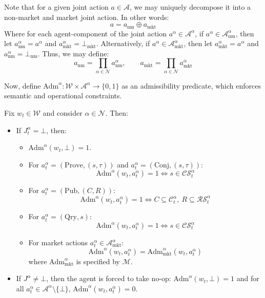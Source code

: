 \documentclass[letterpaper]{article} %
\begin{document}
Note that for a  given joint action $a \in \mathcal{A}$, we may uniquely decompose it into a non-market and market joint action. In other words:
\[a = a_{\mathrm{nm}} \oplus a_{\mathrm{mkt}}\]
Where for each agent-component of the joint action $a^\alpha \in \mathcal{A}^\alpha$, if $a^\alpha \in \mathcal{A}^\alpha_{\mathrm{nm}}$, then let $a^\alpha_{\mathrm{nm}} = a^\alpha$ and $a^\alpha_{\mathrm{mkt}} = \bot_{\mathrm{mkt}}$. Alternatively, if $a^\alpha \in \mathcal{A}^\alpha_{\mathrm{mkt}}$, then let $a^\alpha_{\mathrm{mkt}} = a^\alpha$ and $a^\alpha_{\mathrm{nm}} = \bot_{\mathrm{nm}}$. Thus, we may define:
\[a_{\mathrm{nm}} = \prod_{\alpha \in \mathcal{N}} a^\alpha_{\mathrm{nm}},\qquad a_{\mathrm{mkt}} = \prod_{\alpha \in \mathcal{N}} a^\alpha_{\mathrm{mkt}}\]




Now, define $\mathrm{Adm}^\alpha:\mathcal{W}\times\mathcal{A}^\alpha\to\{0,1\}$ as an admissibility predicate, which enforces semantic and operational constraints. 

Fix $w_t \in \mathcal{W}$ and consider $\alpha \in \mathcal{N}$. Then:
\begin{itemize}
    \item If $J^\alpha_t=\bot$, then:
\begin{itemize}
\item $\mathrm{Adm}^\alpha(w_t,\bot)=1$.
\item For $a^\alpha_t = (\mathrm{Prove},(s,\tau))$ and $a^\alpha_t = (\mathrm{Conj},(s,\tau))$:
\[
\mathrm{Adm}^\alpha(w_t,a^\alpha_t)=1 \iff s \in \mathcal{CS}_t^\alpha
\]
\item For $a^\alpha_t = (\mathrm{Pub},(C,R))$: \[\mathrm{Adm}^\alpha(w_t,a^\alpha_t)=1 \iff C\subseteq\mathcal{C}_t^\alpha,\ R\subseteq\mathcal{RS}_t^\alpha\]
\item For $a^\alpha_t = (\mathrm{Qry},s)$: 
\[\mathrm{Adm}^\alpha(w_t,a_t^\alpha)=1 \iff s \in \mathcal{CS}_t^\alpha\]
\item For market actions $a^\alpha_t\in\mathcal{A}^\alpha_{\mathrm{mkt}}$:
\[
\mathrm{Adm}^\alpha(w_t,a^\alpha_t)= \mathrm{Adm}^\alpha_{\mathrm{mkt}}(w_t,a^\alpha_t) 
\]
where $\mathrm{Adm}_{\mathrm{mkt}}^\alpha$ is specified by $\mathscr{M}$.
\end{itemize}

\item If $J^\alpha\neq\bot$, then the agent is forced to take no-op: $\mathrm{Adm}^\alpha(w_t,\bot)=1$ and for all $a^\alpha_t\in \mathcal{A}^\alpha\setminus\{\bot\}$, $\mathrm{Adm}^\alpha(w_t,a^\alpha_t)=0$.
\end{itemize}
\end{document}
